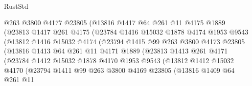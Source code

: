 \begin{lexlean}{RustStd}
\begin{coremodule}
                      @263
                      @3800
                      @4177
                      @23805
                      (@13816
                        @1417
                        @64
                        @261
                        @11
                        @4175
                        @1889
                        (@23813
                          @1417
                          @261
                          @4175
                          (@23784
                            @1416
                            @15032
                            @1878
                            @4174
                            @1953
                            @9543
                            (@13812
                              @1416
                              @15032
                              @4174
                              (@23794
                                @1415
                                @99
                                @263
                                @3800
                                @4173
                                @23805
                                (@13816
                                  @1413
                                  @64
                                  @261
                                  @11
                                  @4171
                                  @1889
                                  (@23813
                                    @1413
                                    @261
                                    @4171
                                    (@23784
                                      @1412
                                      @15032
                                      @1878
                                      @4170
                                      @1953
                                      @9543
                                      (@13812
                                        @1412
                                        @15032
                                        @4170
                                        (@23794
                                          @1411
                                          @99
                                          @263
                                          @3800
                                          @4169
                                          @23805
                                          (@13816
                                            @1409
                                            @64
                                            @261
                                            @11

\end{coremodule}
\end{lexlean}
